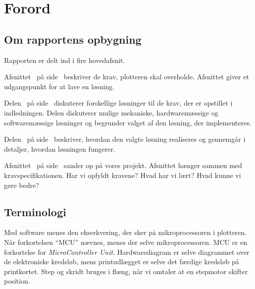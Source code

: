 \chapter{Forord}


\section{Om rapportens opbygning}

Rapporten er delt ind i fire hovedafsnit.

Afsnittet~ på side~\pageref{ch:indledning}
beskriver de krav, plotteren skal overholde. Afsnittet giver et
udgangspunkt for at lave en løsning.

Delen~ på side~\pageref{prt:design} diskuterer
forskellige løsninger til de krav, der er opstillet i
indledningen. Delen diskuterer mulige mekaniske, hardwaremæssige og
softwaremæssige løsninger og begrunder valget af den løsning, der
implementeres.

Delen~ på
side~\pageref{prt:implementering} beskriver, hvordan den valgte
løsning realiseres og gennemgår i detaljer, hvordan løsningen
fungerer.

Afsnittet~ på side~\pageref{ch:afslutning} samler op på vores projekt.
Afsnittet hænger sammen med kravspecifikationen. Har vi opfyldt kravene? Hvad har vi lært?
Hvad kunne vi gøre bedre?

\section{Terminologi}


Med software menes den ekserkvering, der sker på mikroprocessoren i
plotteren. Når forkortelsen \enquote{MCU} nævnes, menes der selve
mikroprocessoren. MCU er en forkortelse for \textit{MicroController
  Unit}. Hardwarediagram er selve diagrammet over de elektroniske
kredsløb, mens printudlægget er selve det færdige kredsløb på
printkortet. Step og skridt bruges i flæng, når vi omtaler at en stepmotor skifter position.


